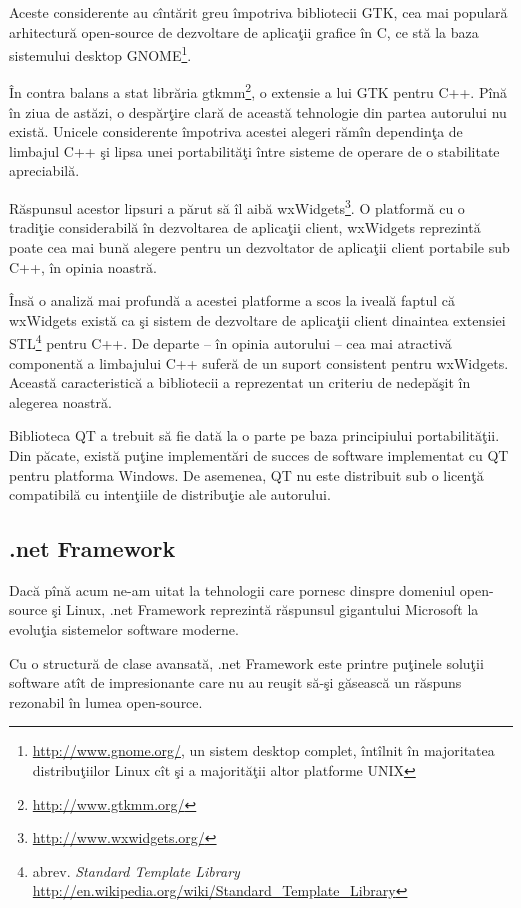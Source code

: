 Aceste considerente au cîntărit greu împotriva bibliotecii GTK, cea mai 
populară arhitectură open-source de dezvoltare de aplicaţii grafice în C, ce 
stă la baza sistemului desktop GNOME\footnote{\url{http://www.gnome.org/}, un 
sistem desktop complet, întîlnit în majoritatea distribuţiilor Linux cît şi a 
majorităţii altor platforme UNIX}.

În contra balans a stat librăria gtkmm\footnote{\url{http://www.gtkmm.org/}}, o 
extensie a lui GTK pentru C++. Pînă în ziua de astăzi, o despărţire clară de 
această tehnologie din partea autorului nu există. Unicele considerente 
împotriva acestei alegeri rămîn dependinţa de limbajul C++ şi lipsa unei 
portabilităţi între sisteme de operare de o stabilitate apreciabilă.

Răspunsul acestor lipsuri a părut să îl aibă 
wxWidgets\footnote{\url{http://www.wxwidgets.org/}}. O platformă cu o tradiţie 
considerabilă în dezvoltarea de aplicaţii client, wxWidgets reprezintă poate 
cea mai bună alegere pentru un dezvoltator de aplicaţii client portabile sub 
C++, în opinia noastră.

Însă o analiză mai profundă a acestei platforme a scos la iveală faptul că 
wxWidgets există ca şi sistem de dezvoltare de aplicaţii client dinaintea 
extensiei STL\footnote{abrev. \textit{Standard Template Library} 
\url{http://en.wikipedia.org/wiki/Standard_Template_Library}} pentru C++. De 
departe -- în opinia autorului -- cea mai atractivă componentă a limbajului C++ 
suferă de un suport consistent pentru wxWidgets.\cite{wxfaq} Această 
caracteristică a bibliotecii a reprezentat un criteriu de nedepăşit în alegerea 
noastră.

Biblioteca QT a trebuit să fie dată la o parte pe baza principiului 
portabilităţii. Din păcate, există puţine implementări de succes de software 
implementat cu QT pentru platforma Windows. De asemenea, QT nu este distribuit 
sub o licenţă compatibilă cu intenţiile de distribuţie ale autorului.

\subsection{.net Framework}

Dacă pînă acum ne-am uitat la tehnologii care pornesc dinspre domeniul 
open-source şi Linux, .net Framework reprezintă răspunsul gigantului Microsoft 
la evoluţia sistemelor software moderne.

Cu o structură de clase avansată, .net Framework este printre puţinele soluţii 
software atît de impresionante care nu au reuşit să-şi găsească un răspuns 
rezonabil în lumea open-source.

